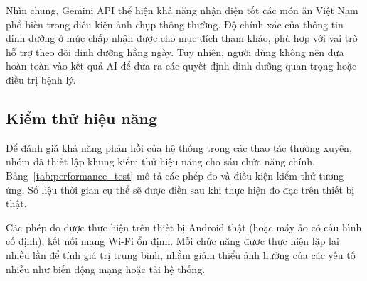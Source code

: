 Nhìn chung, Gemini API thể hiện khả năng nhận diện tốt các món ăn Việt Nam phổ biến trong điều kiện ảnh chụp thông thường. Độ chính xác của thông tin dinh dưỡng ở mức chấp nhận được cho mục đích tham khảo, phù hợp với vai trò hỗ trợ theo dõi dinh dưỡng hằng ngày. Tuy nhiên, người dùng không nên dựa hoàn toàn vào kết quả AI để đưa ra các quyết định dinh dưỡng quan trọng hoặc điều trị bệnh lý.

\subsection{Kiểm thử hiệu năng}

Để đánh giá khả năng phản hồi của hệ thống trong các thao tác thường xuyên, nhóm đã thiết lập khung kiểm thử hiệu năng cho sáu chức năng chính. Bảng~\ref{tab:performance_test} mô tả các phép đo và điều kiện kiểm thử tương ứng. Số liệu thời gian cụ thể sẽ được điền sau khi thực hiện đo đạc trên thiết bị thật.

Các phép đo được thực hiện trên thiết bị Android thật (hoặc máy ảo có cấu hình cố định), kết nối mạng Wi-Fi ổn định. Mỗi chức năng được thực hiện lặp lại nhiều lần để tính giá trị trung bình, nhằm giảm thiểu ảnh hưởng của các yếu tố nhiễu như biến động mạng hoặc tải hệ thống.

